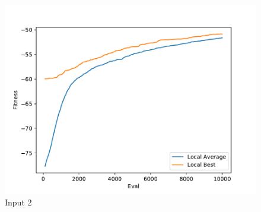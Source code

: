 \documentclass{standalone}
\begin{document}
\begin{figure}[!htb]
	\caption{Input 2}
	\label{fig:graph_2010}
	\includegraphics[width=\textwidth]{../graphs/graphs/2010.pdf}
\end{figure}
\end{document}
